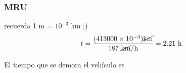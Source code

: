 \documentclass{beamer}
\begin{document}
\begin{frame}
\frametitle{MRU}
% 

{\huge
\tmru
}


{\large
recuerda 1 m = $10^{-3}$ km ;)\\
\begin{equation} t=
\frac{(413000 \times 10^{-3})\cancel{\text{km}}}{187~\cancel{\text{km}}/\text{h}}=
2.21~\text{h}
\end{equation}
}

                               
 
El tiempo que se demora el veh\'iculo es

                                                             
\end{frame}

\end{document}
